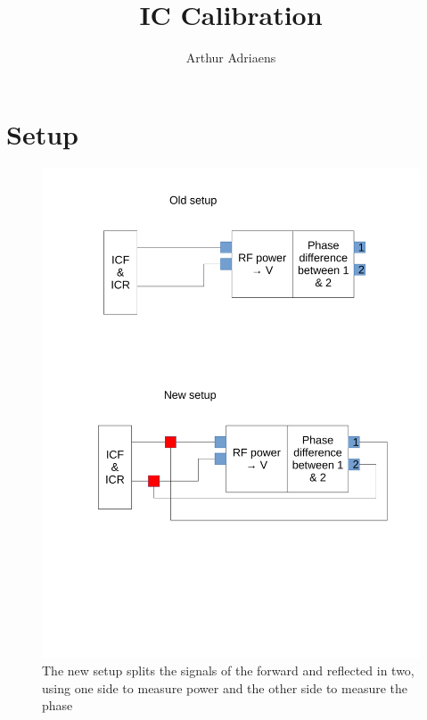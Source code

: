 \documentclass{report}
\title{IC Calibration}
\author{Arthur Adriaens}
\begin{document}
\maketitle

\section{Setup}
\begin{figure}[ht!]
\includegraphics[width=\textwidth]{setup.pdf}
\caption{The new setup splits the signals of the forward and reflected in two, using one side to measure power and the other side to measure the phase}
\end{figure}
\end{document}
